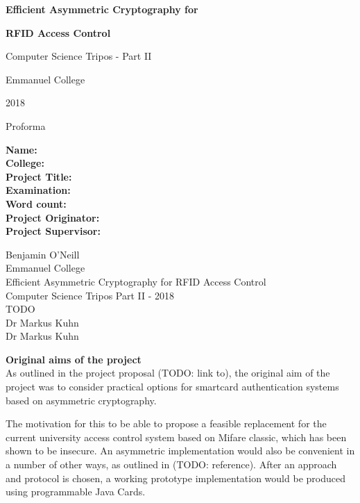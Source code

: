 \documentclass[12pt]{article}
\begin{document}
\thispagestyle{empty}

\vfil

\centerline{\Large\bf Efficient Asymmetric Cryptography for}
\centerline{\Large\bf RFID Access Control}
\vspace{0.4in}
\centerline{\Large Computer Science Tripos - Part II}
\vspace{0.3in}
\centerline{\Large Emmanuel College}
\vspace{0.3in}
\centerline{\Large 2018}
\vfil
\pagebreak

\thispagestyle{empty}
\centerline{\Large Proforma}

\noindent
\begin{minipage}{0.3\textwidth}
\raggedright
{\bf Name:}\\
{\bf College:}\\
{\bf Project Title:}\\
{\bf Examination:}\\
{\bf Word count:}\\
{\bf Project Originator:}\\
{\bf Project Supervisor:}
\end{minipage}
\begin{minipage}{0.7\textwidth}
Benjamin O'Neill\\
Emmanuel College\\
Efficient Asymmetric Cryptography for RFID Access Control\\
Computer Science Tripos Part II - 2018\\
TODO\\
Dr Markus Kuhn\\
Dr Markus Kuhn
\end{minipage}

\vspace{0.3in}
{\large\bf Original aims of the project}\\
As outlined in the project proposal (TODO: link to), the original aim of the project was to consider practical options for smartcard authentication systems based on asymmetric cryptography. 

The motivation for this to be able to propose a feasible replacement for the current university access control system based on Mifare classic, which has been shown to be insecure. An asymmetric implementation would also be convenient in a number of other ways, as outlined in (TODO: reference). After an approach and protocol is chosen, a working prototype implementation would be produced using programmable Java Cards.
\end{document}
